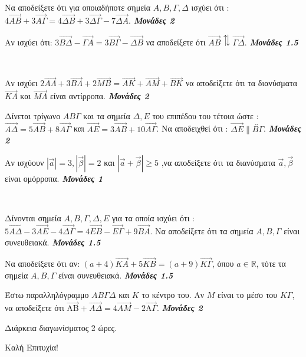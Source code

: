 \documentclass[a4paper,11pt]{article}
\newcommand{\monades}[1]{
\hspace*{\fill}
\textbf{\textit{Μονάδες #1}}}
\newcommand{\kaliepityxia}{\vfill
\begin{flushright}
Καλή Επιτυχία!
\end{flushright}}
\begin{document}
\begin{thema}
\begin{erwthma}
\item Να αποδείξετε ότι για οποιαδήποτε σημεία $ A,B,\varGamma,\varDelta $ ισχύει ότι : $ 4 \overrightarrow{AB}+3 \overrightarrow{A\varGamma}=4 \overrightarrow{\varDelta B}+3 \overrightarrow{\varDelta \varGamma}-7 \overrightarrow{\varDelta A} $.\monades{2}
\item Αν ισχύει ότι: $ 3 \overrightarrow{B\varDelta}-\overrightarrow{\varGamma A}=3 \overrightarrow{B \varGamma}-\overrightarrow{\varDelta B} $ να αποδείξετε ότι $ \overrightarrow{AB}\updownarrows\overrightarrow{\varGamma\varDelta} $.\monades{1.5}
\end{erwthma}
\item\mbox{}\\\vspace{-7mm}
\begin{erwthma}
\item Αν ισχύει $ 2 \overrightarrow{A\varLambda}+3 \overrightarrow{B\varLambda}+2 \overrightarrow{MB}=\overrightarrow{AK}+\overrightarrow{AM}+\overrightarrow{BK} $ να αποδείξετε ότι τα διανύσματα $ \overrightarrow{K\varLambda} $ και $ \overrightarrow{M\varLambda} $ είναι αντίρροπα.\monades{2}
\item Δίνεται τρίγωνο $ AB\varGamma $ και τα σημεία $ \varDelta,E $ του επιπέδου του τέτοια ώστε : $ \overrightarrow{A\varDelta}=5 \overrightarrow{A B}+8 \overrightarrow{A \varGamma} $ και $ \overrightarrow{A E}=3 \overrightarrow{AB}+10 \overrightarrow{A \varGamma} $. Να αποδειχθεί ότι : $ \overrightarrow{\varDelta E}\parallel \overleftrightarrow{B\varGamma} $.\monades{2}
\item Αν ισχύουν $ |\vec{a}|=3,|\vec{\beta}|=2 $ και $ |\vec{a}+\vec{\beta}|\geq 5 $ ,να αποδείξετε ότι τα διανύσματα $ \vec{a},\vec{\beta} $ είναι ομόρροπα.\monades{1}
\end{erwthma}
\item\mbox{}\\\vspace{-7mm}
\begin{erwthma}
\item Δίνονται σημεία $ A,B,\varGamma,\varDelta,E $ για τα οποία ισχύει ότι : $ 5 \overrightarrow{A \varDelta}-3 \overrightarrow{AE}-4 \overrightarrow{\varDelta \varGamma}=4 \overrightarrow{EB}-\overrightarrow{E \varGamma}+9 \overrightarrow{BA} $. Να αποδείξετε ότι τα σημεία $ A,B,\varGamma $ είναι συνευθειακά.\monades{1.5}
\item Να αποδείξετε ότι αν: $ (a+4) \overrightarrow{KA}+5 \overrightarrow{KB}=(a+9) \overrightarrow{K \varGamma} $, όπου $ a\in\mathbb{R} $, τότε τα σημεία $ A,B,\varGamma $ είναι συνευθειακά.\monades{1.5}
\item Έστω παραλληλόγραμμο $ AB\varGamma\varDelta $ και $ K $ το κέντρο του. Αν $ M $ είναι το μέσο του $ K\varGamma $, να αποδείξετε ότι $ \overrightarrow{\mathrm{AB}}+\overrightarrow{A\varDelta}=4 \overrightarrow{AM}-2 \overrightarrow{\mathrm{A\varGamma}} $.\monades{2}
\end{erwthma}
\end{thema}
\begin{flushright}
Διάρκεια διαγωνίσματος 2 ώρες.
\end{flushright}
\kaliepityxia
\end{document}
